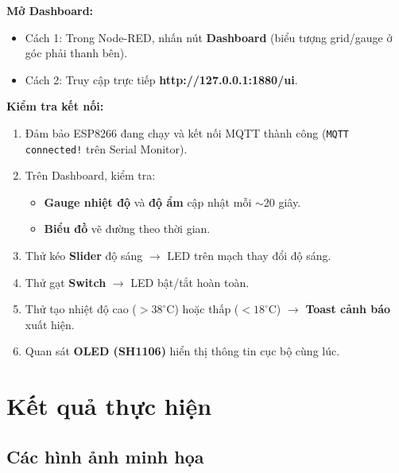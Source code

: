 \documentclass[13pt,a4paper]{article}
\newcommand{\code}[1]{\texttt{#1}}
\begin{document}
\textbf{Mở Dashboard:}

\begin{itemize}
    \item Cách 1: Trong Node-RED, nhấn nút \textbf{Dashboard} (biểu tượng grid/gauge ở góc phải thanh bên).
    \item Cách 2: Truy cập trực tiếp \textbf{http://127.0.0.1:1880/ui}.
\end{itemize}

\textbf{Kiểm tra kết nối:}

\begin{enumerate}[label=\arabic*., leftmargin=1.5cm]
    \item Đảm bảo ESP8266 đang chạy và kết nối MQTT thành công (\code{MQTT connected!} trên Serial Monitor).
    \item Trên Dashboard, kiểm tra:
    \begin{itemize}
        \item \textbf{Gauge nhiệt độ} và \textbf{độ ẩm} cập nhật mỗi $\sim$20 giây.
        \item \textbf{Biểu đồ} vẽ đường theo thời gian.
    \end{itemize}
    \item Thử kéo \textbf{Slider} độ sáng $\rightarrow$ LED trên mạch thay đổi độ sáng.
    \item Thử gạt \textbf{Switch} $\rightarrow$ LED bật/tắt hoàn toàn.
    \item Thử tạo nhiệt độ cao ($>38^\circ$C) hoặc thấp ($<18^\circ$C) $\rightarrow$ \textbf{Toast cảnh báo} xuất hiện.
    \item Quan sát \textbf{OLED (SH1106)} hiển thị thông tin cục bộ cùng lúc.
\end{enumerate}

\FloatBarrier
\section{Kết quả thực hiện}
\label{sec:ketqua}

\subsection{Các hình ảnh minh họa}
\label{sec:hinh}
\end{document}
